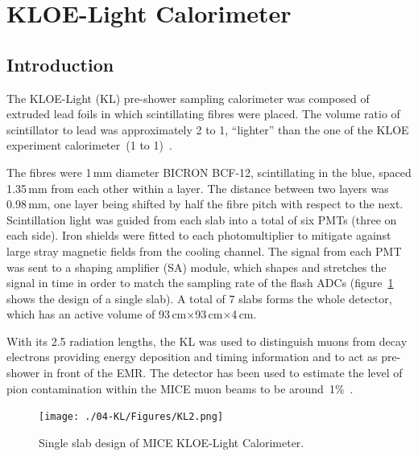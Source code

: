 \graphicspath{{04-KL/Figures/}}

\section{KLOE-Light Calorimeter}
\label{Sect:KL}

\subsection{Introduction}
\label{SubSect:KL_Intro}

The KLOE-Light (KL) pre-shower sampling calorimeter was composed of extruded lead foils in which scintillating fibres were placed. The volume ratio of scintillator to lead was approximately 2 to 1, ``lighter'' than the one of the KLOE experiment calorimeter~(1 to 1)~\cite{Ambrosino:2009zza}.

The fibres were 1\,mm diameter BICRON BCF-12, scintillating in the blue, spaced 1.35\,mm from each other within a layer. The distance between two layers was 0.98\,mm, one layer being shifted by half the fibre pitch with respect to the next.
Scintillation light was guided from each slab into a total of six PMTs (three on each side). Iron shields were fitted to each photomultiplier to
mitigate against large stray magnetic fields from the cooling channel. The signal from each PMT was sent to a shaping amplifier (SA) module, which shapes and stretches the signal in time in order to match the sampling rate of the flash ADCs (figure~\ref{fig:KL2} shows the design of a single slab).
A total of 7 slabs forms the whole detector, which has an active volume of 93\,cm$\times$93\,cm$\times$4\,cm.

With its 2.5 radiation lengths, the KL was used to distinguish muons from decay electrons providing energy deposition and timing information and to act as pre-shower in front of the EMR.
The detector has been used to estimate the level of pion contamination within the MICE muon beams to be around~1\%~\cite{2016JInst..11P3001A}.
\begin{figure}[htb!]
  \begin{center}
    \texttt{[image: ./04-KL/Figures/KL2.png]}
    \caption{Single slab design of MICE KLOE-Light Calorimeter.}
    \label{fig:KL2}
  \end{center}
\end{figure}



